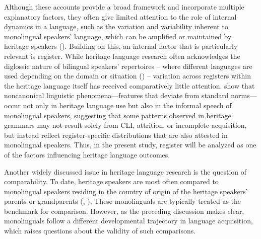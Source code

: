 Although these accounts provide a broad framework and incorporate multiple explanatory factors, they often give limited attention to the role of internal dynamics in a language, such as the variation and variability inherent to monolingual speakers’ language, which can be amplified or maintained by heritage speakers (\citealt{FloresRinke2020}). Building on this, an internal factor that is particularly relevant is register. While heritage language research often acknowledges the diglossic nature of bilingual speakers’ repertoires -- where different languages are used depending on the domain or situation (\citealt[323-324]{Polinsky2018}) -- variation across registers within the heritage language itself has received comparatively little attention. \citet{WieseEtAl2022} show that noncanonical linguistic phenomena—features that deviate from standard norms—occur not only in heritage language use but also in the informal speech of monolingual speakers, suggesting that some patterns observed in heritage grammars may not result solely from CLI, attrition, or incomplete acquisition, but instead reflect register-specific distributions that are also attested in monolingual speakers. Thus, in the present study, register will be analyzed as one of the factors influencing heritage language outcomes.

Another widely discussed issue in heritage language research is the question of comparability. To date, heritage speakers are most often compared to monolingual speakers residing in the country of origin of the heritage speakers’ parents or grandparents (\citealt{RothmanEtAl2023}, \citealt{alexiadou_methodological_2025}). These monolinguals are typically treated as the benchmark for comparison. However, as the preceding discussion makes clear, monolinguals follow a different developmental trajectory in language acquisition, which raises questions about the validity of such comparisons.

